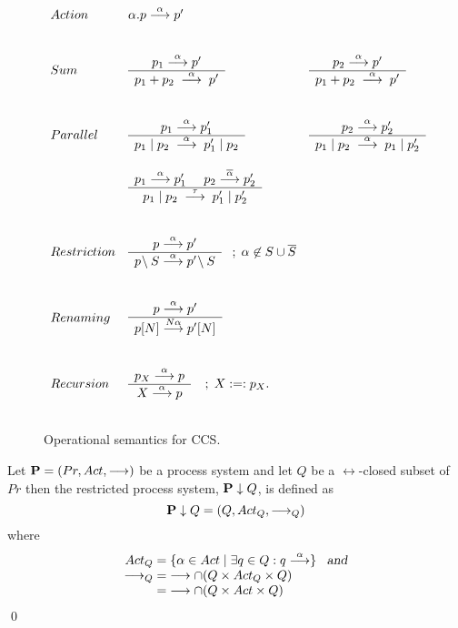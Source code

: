 \begin{figure}
\[
\begin{array}{lll}
Action      & \alpha.p\stackrel{\alpha}{\longrightarrow}p' &\\
\\
\\
Sum         & \begin{array}{c}p_1\stackrel{\alpha}{\longrightarrow}p'\\ \hline p_1+p_2\;\stackrel{\alpha}{\longrightarrow}\;p'\end{array}
            & \begin{array}{c}p_2\stackrel{\alpha}{\longrightarrow}p'\\ \hline p_1+p_2\;\stackrel{\alpha}{\longrightarrow}\;p'\end{array}\\
\\
\\
Parallel    & \begin{array}{c}p_1\stackrel{\alpha}{\longrightarrow}p'_1\\ \hline p_1\mid p_2\;\stackrel{\alpha}{\longrightarrow}\;p'_1\mid p_2\end{array}
            & \begin{array}{c}p_2\stackrel{\alpha}{\longrightarrow}p'_2\\ \hline p_1\mid p_2\;\stackrel{\alpha}{\longrightarrow}\;p_1\mid p'_2\end{array}\\
\\
            & \begin{array}{c}p_1\stackrel{\alpha}{\longrightarrow}p'_1\;\;\;\;\;p_2\stackrel{\overline{\alpha}}{\longrightarrow}p'_2\\ \hline p_1\mid p_2\;\stackrel{\tau}{\longrightarrow}\;p'_1\mid p'_2\end{array}\\
\\
\\
Restriction & \begin{array}{c}p\stackrel{\alpha}{\longrightarrow}p'\\ \hline p\!\setminus S\stackrel{\alpha}{\longrightarrow}p'\!\setminus S\end{array}\;\;\;;\;\alpha\not\in S\cup\overline{S}\\
\\
\\
Renaming    & \begin{array}{c}p\stackrel{\alpha}{\longrightarrow}p'\\ \hline p[N]\stackrel{N\alpha}{\longrightarrow}p'[N]\end{array}\\
\\
\\
Recursion   & \begin{array}{c}p_X\stackrel{\alpha}{\longrightarrow}p\\ \hline X\stackrel{\alpha}{\longrightarrow}p\end{array}\;\;\;\;;\; X:=: p_X.\\
\\
\end{array}
\]
\caption{Operational semantics for CCS.}\label{figOpSemantics}
\end{figure}


\begin{definition}
Let $\hbox{\bf P} = (Pr,Act,\stackrel{}{\longrightarrow})$ be a process system and let $Q$ be a $\rel{}$-closed subset of $Pr$ then the restricted process system, $\hbox{\bf P}\downarrow Q$, is defined as
\[
\hbox{\bf P}\downarrow Q = (Q,Act_Q,\stackrel{}{\longrightarrow}_Q)
\]
where
\[
\begin{array}{r@{\;=\;}l}
Act_Q    & \{\alpha\in Act\mid\exists q\in Q: q\rel{\alpha}\}\;\;\; \hbox{\sl and}\\
\rel{}_Q & \rel{} \cap(Q\times Act_Q \times Q)\\
         & \rel{} \cap(Q\times Act \times Q)\\
\end{array}
\]
\qed
\end{definition}


